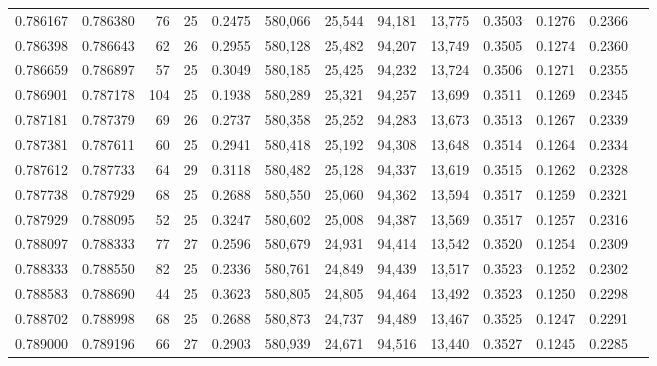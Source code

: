 \begin{tabular}{rrrrrrrrrrrrr}
0.786167 & 0.786380 &    76 &  25 &                                     0.2475 & 580,066 &  25,544 &  94,181 &  13,775 & 0.3503 & 0.1276 & 0.2366 \\
0.786398 & 0.786643 &    62 &  26 &                                     0.2955 & 580,128 &  25,482 &  94,207 &  13,749 & 0.3505 & 0.1274 & 0.2360 \\
0.786659 & 0.786897 &    57 &  25 &                                     0.3049 & 580,185 &  25,425 &  94,232 &  13,724 & 0.3506 & 0.1271 & 0.2355 \\
0.786901 & 0.787178 &   104 &  25 &                                     0.1938 & 580,289 &  25,321 &  94,257 &  13,699 & 0.3511 & 0.1269 & 0.2345 \\
0.787181 & 0.787379 &    69 &  26 &                                     0.2737 & 580,358 &  25,252 &  94,283 &  13,673 & 0.3513 & 0.1267 & 0.2339 \\
0.787381 & 0.787611 &    60 &  25 &                                     0.2941 & 580,418 &  25,192 &  94,308 &  13,648 & 0.3514 & 0.1264 & 0.2334 \\
0.787612 & 0.787733 &    64 &  29 &                                     0.3118 & 580,482 &  25,128 &  94,337 &  13,619 & 0.3515 & 0.1262 & 0.2328 \\
0.787738 & 0.787929 &    68 &  25 &                                     0.2688 & 580,550 &  25,060 &  94,362 &  13,594 & 0.3517 & 0.1259 & 0.2321 \\
0.787929 & 0.788095 &    52 &  25 &                                     0.3247 & 580,602 &  25,008 &  94,387 &  13,569 & 0.3517 & 0.1257 & 0.2316 \\
0.788097 & 0.788333 &    77 &  27 &                                     0.2596 & 580,679 &  24,931 &  94,414 &  13,542 & 0.3520 & 0.1254 & 0.2309 \\
0.788333 & 0.788550 &    82 &  25 &                                     0.2336 & 580,761 &  24,849 &  94,439 &  13,517 & 0.3523 & 0.1252 & 0.2302 \\
0.788583 & 0.788690 &    44 &  25 &                                     0.3623 & 580,805 &  24,805 &  94,464 &  13,492 & 0.3523 & 0.1250 & 0.2298 \\
0.788702 & 0.788998 &    68 &  25 &                                     0.2688 & 580,873 &  24,737 &  94,489 &  13,467 & 0.3525 & 0.1247 & 0.2291 \\
0.789000 & 0.789196 &    66 &  27 &                                     0.2903 & 580,939 &  24,671 &  94,516 &  13,440 & 0.3527 & 0.1245 & 0.2285 \\

\end{tabular}
